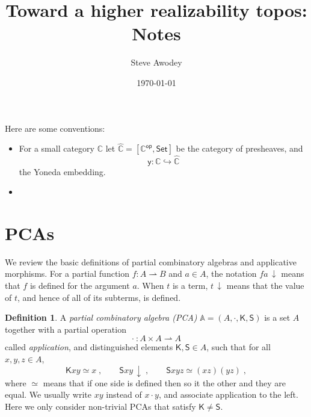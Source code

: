 \documentclass[12pt]{article}
\newcommand{\parto}{\mathrel{\rightharpoonup}}
\newcommand{\cc}{\colon}
\newcommand{\pcacomb}[1]{\mathsf{#1}}
\newcommand{\defined}{\,{\downarrow}}
\newcommand{\combK}{\pcacomb{K}}
\newcommand{\combS}{\pcacomb{S}}
\newcommand{\kleq}{\simeq}
\newcommand{\A}{\ensuremath{\mathbb{A}}}
\newcommand{\C}{\ensuremath{\mathbb{C}}}
\newcommand{\op}[1]{\ensuremath{{#1}^{\mathsf{op}}}}
\newcommand{\psh}[1]{\ensuremath{[\op{#1},\mathsf{Set}]}}
\newcommand{\pshat}[1]{\ensuremath{\widehat{#1}}}
\newcommand{\y}{\ensuremath{\mathsf{y}}} %
\newcommand{\hook}{\ensuremath{\hookrightarrow}}
\theoremstyle{remark}
\theoremstyle{definition}
\newtheorem{definition}[theorem]{Definition}
\begin{document}

\title{Toward a higher realizability topos: Notes}
\author{Steve Awodey}
\date{\today}
\maketitle

Here are some conventions:
%
\begin{itemize}
\item For a small category $\C$ let $\pshat{\C} = \psh{\C}$ be the category of presheaves, and
\[
\y : \C \hook\pshat{\C}
\]
the Yoneda embedding.
%
\item 

\end{itemize}

\section{PCAs}

We review the basic definitions of partial combinatory
algebras and applicative morphisms. For a partial
function $f\cc A \parto B$ and $a \in A$, the notation $f a \defined$
means that $f$ is defined for the argument $a$. When $t$ is a term, $t \defined$ means
that the value of $t$, and hence of all of its subterms, is defined.

\begin{definition}
  A \emph{partial combinatory algebra (PCA)} $\A = (A, \cdot, \combK, \combS)$ is a set $A$ together with a
  partial operation 
  \[
  \cdot \ \cc A \times A \parto A
  \]
  called \emph{application}, and distinguished elements $\combK, \combS \in A$,
  such that for all $x, y, z \in A$,
  \begin{equation*}
    \combK x y \kleq x \;,
    \qquad
    \combS x y \defined \;,
    \qquad
    \combS x y z \kleq (x z)(y z) \;,
  \end{equation*}
  where $\kleq$ means that if one side is defined then so it the other
  and they are equal. We usually write $x y$ instead of $x \cdot y$,
  and associate application to the left. Here we only consider
  non-trivial PCAs that satisfy $\combK \neq \combS$.
\end{definition}
\end{document}
